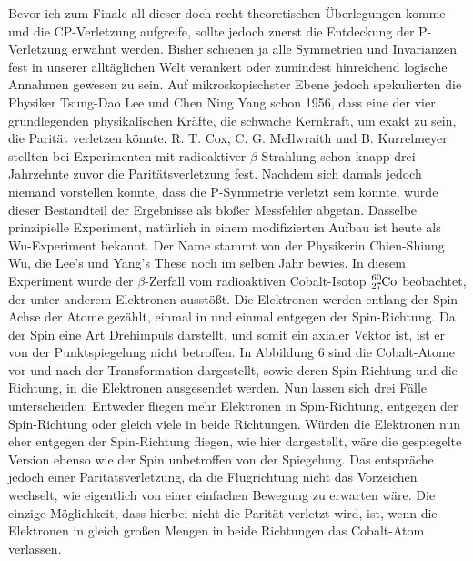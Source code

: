 \documentclass[12pt,a4paper]{scrartcl}
\numberwithin{equation}{section}
\begin{document}
Bevor ich zum Finale all dieser doch recht theoretischen Überlegungen komme und die CP-Verletzung aufgreife, sollte jedoch zuerst die Entdeckung der P-Verletzung erwähnt werden. Bisher schienen ja alle Symmetrien und Invarianzen fest in unserer alltäglichen Welt verankert oder zumindest hinreichend logische Annahmen gewesen zu sein. Auf mikroskopischster Ebene jedoch spekulierten die Physiker Tsung-Dao Lee und Chen Ning Yang schon 1956, dass eine der vier grundlegenden physikalischen Kräfte, die schwache Kernkraft, um exakt zu sein, die Parität verletzen könnte.\cite{leeyang56} R. T. Cox, C. G. McIlwraith und B. Kurrelmeyer stellten bei Experimenten mit radioaktiver $\beta$-Strahlung schon knapp drei Jahrzehnte zuvor die Paritätsverletzung fest. Nachdem sich damals jedoch niemand vorstellen konnte, dass die P-Symmetrie verletzt sein könnte, wurde dieser Bestandteil der Ergebnisse als bloßer Messfehler abgetan.\cite{coxkurrelmeyer28} Dasselbe prinzipielle Experiment, natürlich in einem modifizierten Aufbau ist heute als Wu-Experiment bekannt. Der Name stammt von der Physikerin Chien-Shiung Wu, die Lee's und Yang's These noch im selben Jahr bewies. In diesem Experiment wurde der $\beta$-Zerfall vom radioaktiven Cobalt-Isotop $\ce{^{60}_{27}Co}$ beobachtet, der unter anderem Elektronen ausstößt. Die Elektronen werden entlang der Spin-Achse der Atome gezählt, einmal in und einmal entgegen der Spin-Richtung. Da der Spin eine Art Drehimpuls darstellt, und somit ein axialer Vektor ist, ist er von der Punktspiegelung nicht betroffen. In Abbildung 6 sind die Cobalt-Atome vor und nach der Transformation dargestellt, sowie deren Spin-Richtung und die Richtung, in die Elektronen ausgesendet werden. Nun lassen sich drei Fälle unterscheiden: Entweder fliegen mehr Elektronen in Spin-Richtung, entgegen der Spin-Richtung oder gleich viele in beide Richtungen. Würden die Elektronen nun eher entgegen der Spin-Richtung fliegen, wie hier dargestellt, wäre die gespiegelte Version ebenso wie der Spin unbetroffen von der Spiegelung. Das entspräche jedoch einer Paritätsverletzung, da die Flugrichtung nicht das Vorzeichen wechselt, wie eigentlich von einer einfachen Bewegung zu erwarten wäre.
Die einzige Möglichkeit, dass hierbei nicht die Parität verletzt wird, ist, wenn die Elektronen in gleich großen Mengen in beide Richtungen das Cobalt-Atom verlassen.
\end{document}
